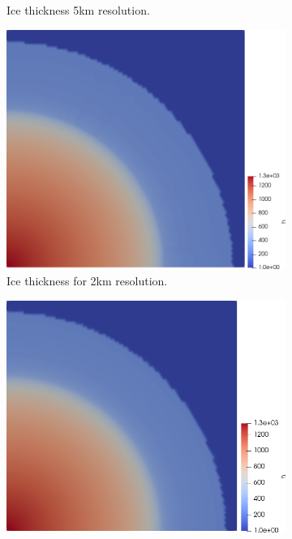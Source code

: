 \documentclass{article}
\begin{document}
\begin{figure}[!h]
\begin{minipage}[t]{.25\textwidth}
\begin{subfigure}{\textwidth}
			\caption{Ice thickness 5km resolution.}
			\label{h5km}
		\end{subfigure}\hfil %
		\begin{subfigure}{\textwidth}
			\includegraphics[width=\linewidth]{../fig/h_2km_quarter.png}
			\caption{Ice thickness for 2km resolution.}
			\label{h2km}
		\end{subfigure}
		\begin{subfigure}{\textwidth}
		\includegraphics[width=\linewidth]{../fig/h_1km_quarter.png}

\end{subfigure}
\end{minipage}
\end{figure}
\end{document}

